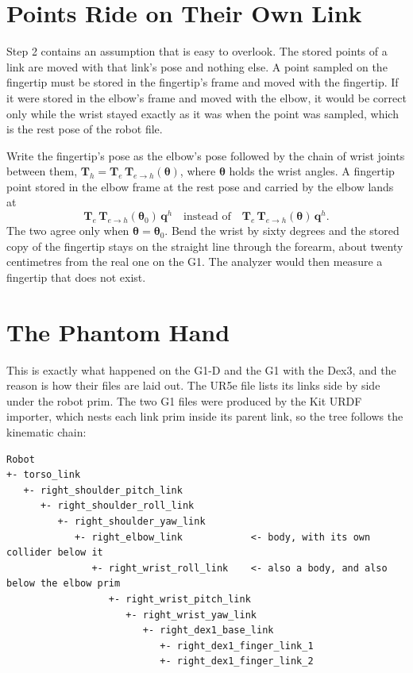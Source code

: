 

\section{Points Ride on Their Own Link}
\label{sec:ride}

Step 2 contains an assumption that is easy to overlook. The stored points of a link are moved with that link's pose and nothing else. A point sampled on the fingertip must be stored in the fingertip's frame and moved with the fingertip. If it were stored in the elbow's frame and moved with the elbow, it would be correct only while the wrist stayed exactly as it was when the point was sampled, which is the rest pose of the robot file.

Write the fingertip's pose as the elbow's pose followed by the chain of wrist joints between them, $\mathbf{T}_{h} = \mathbf{T}_{e}\,\mathbf{T}_{e\to h}(\boldsymbol{\theta})$, where $\boldsymbol{\theta}$ holds the wrist angles. A fingertip point stored in the elbow frame at the rest pose and carried by the elbow lands at
\begin{equation}
  \mathbf{T}_{e}\,\mathbf{T}_{e\to h}(\boldsymbol{\theta}_0)\,\mathbf{q}^{h}
  \quad\text{instead of}\quad
  \mathbf{T}_{e}\,\mathbf{T}_{e\to h}(\boldsymbol{\theta})\,\mathbf{q}^{h}.
  \label{eq:phantom}
\end{equation}
The two agree only when $\boldsymbol{\theta} = \boldsymbol{\theta}_0$. Bend the wrist by sixty degrees and the stored copy of the fingertip stays on the straight line through the forearm, about twenty centimetres from the real one on the G1. The analyzer would then measure a fingertip that does not exist.

\section{The Phantom Hand}
\label{sec:phantom}

This is exactly what happened on the G1-D and the G1 with the Dex3, and the reason is how their files are laid out. The UR5e file lists its links side by side under the robot prim. The two G1 files were produced by the Kit URDF importer, which nests each link prim inside its parent link, so the tree follows the kinematic chain:

\begin{lstlisting}[language={}, numbers=none, xleftmargin=4pt, basicstyle=\ttfamily\scriptsize]
Robot
+- torso_link
   +- right_shoulder_pitch_link
      +- right_shoulder_roll_link
         +- right_shoulder_yaw_link
            +- right_elbow_link            <- body, with its own collider below it
               +- right_wrist_roll_link    <- also a body, and also below the elbow prim
                  +- right_wrist_pitch_link
                     +- right_wrist_yaw_link
                        +- right_dex1_base_link
                           +- right_dex1_finger_link_1
                           +- right_dex1_finger_link_2
\end{lstlisting}

